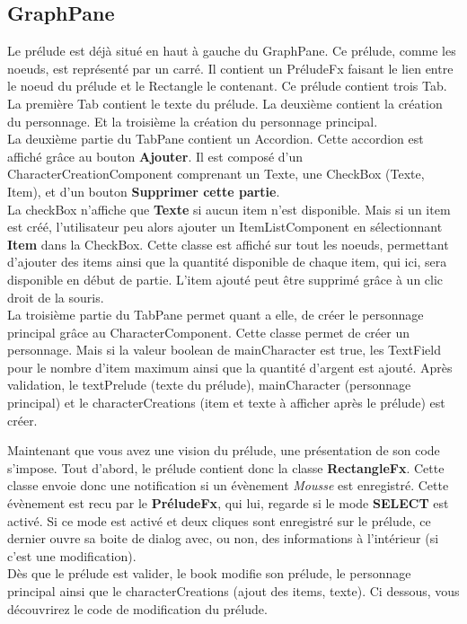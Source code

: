 		\subsection{GraphPane}

			Le prélude est déjà situé en haut à gauche du GraphPane. Ce prélude, comme les noeuds, est représenté par un carré. Il contient un PréludeFx faisant le lien entre le noeud du prélude et le Rectangle le contenant. Ce prélude contient trois Tab. La première Tab contient le texte du prélude. La deuxième contient la création du personnage. Et la troisième la création du personnage principal.\\
			La deuxième partie du TabPane contient un Accordion. Cette accordion est affiché grâce au bouton \textbf{Ajouter}. Il est composé d'un CharacterCreationComponent comprenant un Texte, une CheckBox (Texte, Item), et d'un bouton \textbf{Supprimer cette partie}.\\
			La checkBox n'affiche que \textbf{Texte} si aucun item n'est disponible. Mais si un item est créé, l'utilisateur peu alors ajouter un ItemListComponent en sélectionnant \textbf{Item} dans la CheckBox. Cette classe est affiché sur tout les noeuds, permettant d'ajouter des items ainsi que la quantité disponible de chaque item, qui ici, sera disponible en début de partie. L'item ajouté peut être supprimé grâce à un clic droit de la souris.\\
			La troisième partie du TabPane permet quant a elle, de créer le personnage principal grâce au CharacterComponent. Cette classe permet de créer un personnage. Mais si la valeur boolean de mainCharacter est true, les TextField pour le nombre d'item maximum ainsi que la quantité d'argent est ajouté.
			Après validation, le textPrelude (texte du prélude), mainCharacter (personnage principal) et le characterCreations (item et texte à afficher après le prélude) est créer.

			Maintenant que vous avez une vision du prélude, une présentation de son code s'impose. Tout d'abord, le prélude contient donc la classe \textbf{RectangleFx}. Cette classe envoie donc une notification si un évènement \textit{Mousse} est enregistré. Cette évènement est recu par le \textbf{PréludeFx}, qui lui, regarde si le mode \textbf{SELECT} est activé. Si ce mode est activé et deux cliques sont enregistré sur le prélude, ce dernier ouvre sa boite de dialog avec, ou non, des informations à l'intérieur (si c'est une modification).\\
			Dès que le prélude est valider, le book modifie son prélude, le personnage principal ainsi que le characterCreations (ajout des items, texte). Ci dessous, vous découvrirez le code de modification du prélude.

